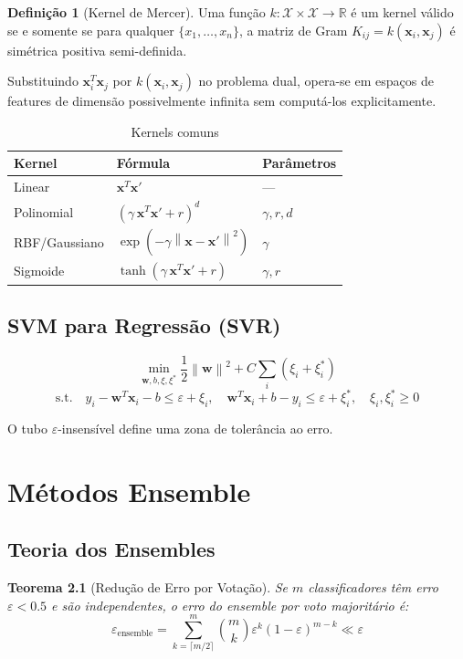 \documentclass[12pt,a4paper,twoside]{book}
\newtheorem{teorema}{Teorema}[chapter]
\theoremstyle{definition}
\newtheorem{definicao}{Definição}[chapter]
\theoremstyle{remark}
\newcommand{\R}{\mathbb{R}}
\newcommand{\bx}{\bm{x}}
\newcommand{\bw}{\bm{w}}
\newcommand{\norm}[1]{\left\|#1\right\|}
\begin{document}
\begin{definicao}[Kernel de Mercer]
Uma função $k: \mathcal{X} \times \mathcal{X} \to \R$ é um kernel válido se e somente se para qualquer $\{x_1,\ldots,x_n\}$, a matriz de Gram $K_{ij} = k(\bx_i, \bx_j)$ é simétrica positiva semi-definida.
\end{definicao}

Substituindo $\bx_i^T\bx_j$ por $k(\bx_i,\bx_j)$ no problema dual, opera-se em espaços de features de dimensão possivelmente infinita sem computá-los explicitamente.

\begin{table}[H]
\centering
\caption{Kernels comuns}
\begin{tabular}{lll}
\toprule
\textbf{Kernel} & \textbf{Fórmula} & \textbf{Parâmetros} \\
\midrule
Linear & $\bx^T\bx'$ & --- \\
Polinomial & $(\gamma\,\bx^T\bx' + r)^d$ & $\gamma, r, d$ \\
RBF/Gaussiano & $\exp(-\gamma\norm{\bx-\bx'}^2)$ & $\gamma$ \\
Sigmoide & $\tanh(\gamma\,\bx^T\bx' + r)$ & $\gamma, r$ \\
\bottomrule
\end{tabular}
\end{table}

\section{SVM para Regressão (SVR)}

\[
\min_{\bw,b,\xi,\xi^*} \frac{1}{2}\norm{\bw}^2 + C\sum_i(\xi_i + \xi_i^*)
\]
\[
\text{s.t.}\quad y_i - \bw^T\bx_i - b \leq \varepsilon + \xi_i, \quad \bw^T\bx_i + b - y_i \leq \varepsilon + \xi_i^*, \quad \xi_i, \xi_i^* \geq 0
\]

O tubo $\varepsilon$-insensível define uma zona de tolerância ao erro.

\chapter{Métodos Ensemble}

\section{Teoria dos Ensembles}

\begin{teorema}[Redução de Erro por Votação]
Se $m$ classificadores têm erro $\varepsilon < 0.5$ e são independentes, o erro do ensemble por voto majoritário é:
\[
\varepsilon_{\text{ensemble}} = \sum_{k=\lceil m/2 \rceil}^{m} \binom{m}{k} \varepsilon^k (1-\varepsilon)^{m-k} \ll \varepsilon
\]
\end{teorema}
\end{document}
